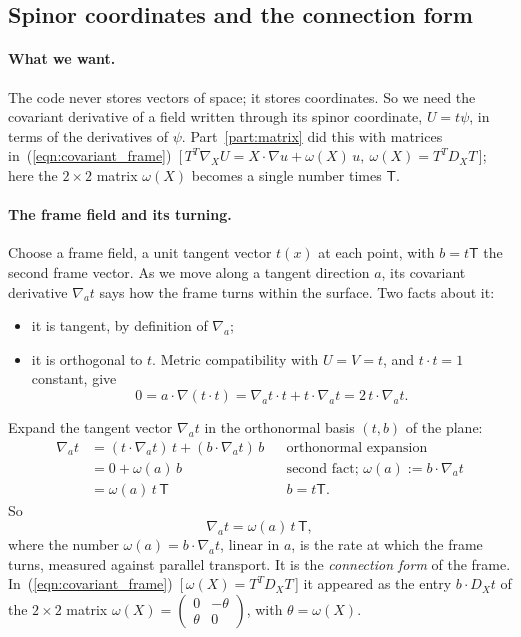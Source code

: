 \subsection{Spinor coordinates and the connection form}
\label{section:ga_gauge}

\paragraph{What we want.} The code never stores vectors of space; it stores coordinates. So we need the covariant derivative of a field written through its spinor coordinate, $U = t\psi$, in terms of the derivatives of $\psi$. Part~\ref{part:matrix} did this with matrices in~(\ref{eqn:covariant_frame})~[\,$T^T\nabla_X U = X\cdot\nabla u + \omega(X)\,u,\ \omega(X) = T^TD_XT$\,]; here the $2\times 2$ matrix $\omega(X)$ becomes a single number times $\mathsf T$.

\paragraph{The frame field and its turning.} Choose a frame field, a unit tangent vector $t(x)$ at each point, with $b = t\mathsf T$ the second frame vector. As we move along a tangent direction $a$, its covariant derivative $\nabla_a t$ says how the frame turns within the surface. Two facts about it:
\begin{itemize}
\item it is tangent, by definition of $\nabla_a$;
\item it is orthogonal to $t$. Metric compatibility with $U = V = t$, and $t\cdot t = 1$ constant, give
\begin{equation*}
0 = a\cdot\nabla(t\cdot t) = \nabla_a t\cdot t + t\cdot\nabla_a t = 2\, t\cdot\nabla_a t .
\end{equation*}
\end{itemize}
Expand the tangent vector $\nabla_a t$ in the orthonormal basis $(t, b)$ of the plane:
\begin{align*}
\nabla_a t &= (t\cdot\nabla_a t)\, t + (b\cdot\nabla_a t)\, b && \text{orthonormal expansion} \\
&= 0 + \omega(a)\, b && \text{second fact; } \omega(a) := b\cdot\nabla_a t \\
&= \omega(a)\, t\,\mathsf T && b = t\mathsf T .
\end{align*}
So
\begin{equation}
\label{eqn:ga_omega}
\nabla_a t = \omega(a)\, t\, \mathsf T ,
\end{equation}
where the number $\omega(a) = b\cdot\nabla_a t$, linear in $a$, is the rate at which the frame turns, measured against parallel transport. It is the \emph{connection form} of the frame. In~(\ref{eqn:covariant_frame})~[\,$\omega(X) = T^TD_XT$\,] it appeared as the entry $b\cdot D_X t$ of the $2\times 2$ matrix $\omega(X) = \begin{pmatrix}0 & -\theta\\ \theta & 0\end{pmatrix}$, with $\theta = \omega(X)$.

